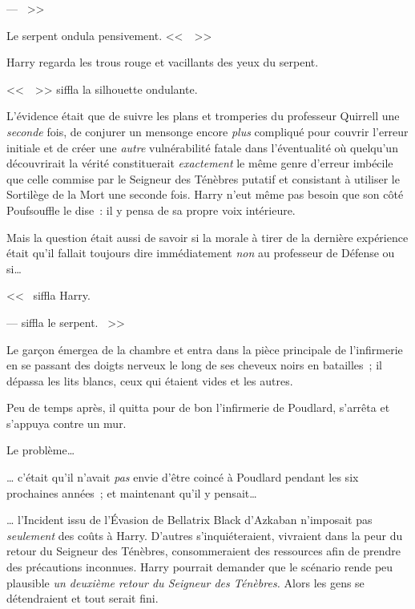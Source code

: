 --- ~>>

Le serpent ondula pensivement. <<~~>>

Harry regarda les trous rouge et vacillants des yeux du serpent.

<<~~>> siffla la silhouette ondulante.

L'évidence était que de suivre les plans et tromperies du professeur Quirrell une \emph{seconde} fois, de conjurer un mensonge encore \emph{plus} compliqué pour couvrir l'erreur initiale et de créer une \emph{autre} vulnérabilité fatale dans l'éventualité où quelqu'un découvrirait la vérité constituerait \emph{exactement} le même genre d'erreur imbécile que celle commise par le Seigneur des Ténèbres putatif et consistant à utiliser le Sortilège de la Mort une seconde fois. Harry n'eut même pas besoin que son côté Poufsouffle le dise~: il y pensa de sa propre voix intérieure.

Mais la question était aussi de savoir si la morale à tirer de la dernière expérience était qu'il fallait toujours dire immédiatement \emph{non} au professeur de Défense ou si…

<<~ siffla Harry. 

---  siffla le serpent. ~>>

\later

Le garçon émergea de la chambre et entra dans la pièce principale de l'infirmerie en se passant des doigts nerveux le long de ses cheveux noirs en batailles~; il dépassa les lits blancs, ceux qui étaient vides et les autres.

Peu de temps après, il quitta pour de bon l'infirmerie de Poudlard, s'arrêta et s'appuya contre un mur.

Le problème…

… c'était qu'il n'avait \emph{pas} envie d'être coincé à Poudlard pendant les six prochaines années~; et maintenant qu'il y pensait…

… l'Incident issu de l'Évasion de Bellatrix Black d'Azkaban n'imposait pas \emph{seulement} des coûts à Harry. D'autres s'inquiéteraient, vivraient dans la peur du retour du Seigneur des Ténèbres, consommeraient des ressources afin de prendre des précautions inconnues. Harry pourrait demander que le scénario rende peu plausible \emph{un deuxième retour du Seigneur des Ténèbres.} Alors les gens se détendraient et tout serait fini.

